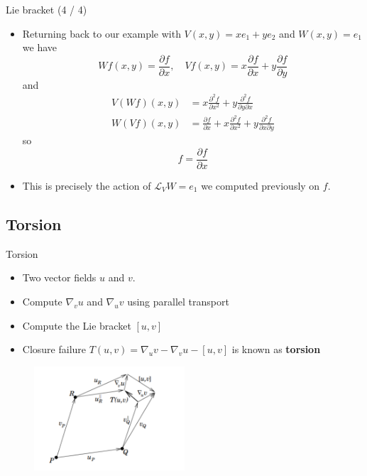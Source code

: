 \documentclass{beamer}
\begin{document}
\begin{frame}{Lie bracket (4 / 4)}
    \begin{itemize}
        \item Returning back to our example with $V(x, y) = xe_1 + ye_2$ and $W(x, y) = e_1$ we have 
        \begin{equation}
            Wf(x,  y) = \frac{\partial f}{\partial x}, \quad Vf(x, y) = x \frac{\partial f}{\partial x} + y \frac{\partial f}{\partial y}
        \end{equation}
        and 
        \begin{align}
            V(Wf)(x, y) &= x \frac{\partial^2 f}{\partial x^2} + y \frac{\partial^2 f}{\partial y \partial x} \\
            W(Vf)(x, y) &= \frac{\partial f}{\partial x} + x \frac{\partial^2 f}{\partial x^2} + y \frac{\partial^2 f}{\partial x \partial y}
        \end{align}
        so 
        \begin{equation}
            [V, W]f = \frac{\partial f}{\partial x}
        \end{equation}
        \item This is precisely the action of $\mathcal{L}_V W = e_1$ we computed previously on $f$. 
    \end{itemize}
\end{frame}

\subsection{Torsion}
\begin{frame}{Torsion}
    \begin{itemize}
        \item Two vector fields $u$ and $v$. 
        \item Compute $\nabla_v u$ and $\nabla_u v$ using parallel transport
        \item Compute the Lie bracket $[u, v]$
        \item Closure failure $T(u, v) = \nabla_u v - \nabla_v u - [u, v]$ is known as {\color{blue}\textbf{torsion}}
    \end{itemize}
    \begin{figure}[h!]
        \includegraphics[width=0.5\textwidth]{images/torsion.png}
    \end{figure}
\end{frame}
\end{document}

